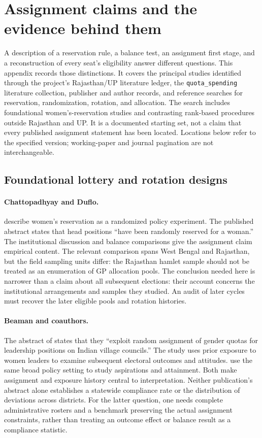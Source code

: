 \section{Assignment claims and the evidence behind them}
\label{app:evidence}

A description of a reservation rule, a balance test, an assignment first stage,
and a reconstruction of every seat's eligibility answer different questions.
This appendix records those distinctions. It covers the principal studies
identified through the project's Rajasthan/UP literature ledger, the
\texttt{quota\_spending} literature collection, publisher and author records,
and reference searches for reservation, randomization, rotation, and allocation.
The search includes foundational women's-reservation studies and contrasting
rank-based procedures outside Rajasthan and UP. It is a documented starting
set, not a claim that every published assignment statement has been located.
Locations below refer to the specified version; working-paper and journal
pagination are not interchangeable.

\subsection{Foundational lottery and rotation designs}

\paragraph{Chattopadhyay and Duflo.}
\citet{chattopadhyay2004} describe women's reservation as a randomized policy
experiment. The published abstract states that head positions ``have been
randomly reserved for a woman.'' The institutional discussion and balance
comparisons give the assignment claim empirical content. The relevant
comparison spans West Bengal and Rajasthan, but the field sampling units differ:
the Rajasthan hamlet sample should not be treated as an enumeration of GP
allocation pools. The conclusion needed here is narrower than a claim about
all subsequent elections: their account concerns the institutional arrangements
and samples they studied. An audit of later cycles must recover the later
eligible pools and rotation histories.

\paragraph{Beaman and coauthors.}
The abstract of \citet{beaman2009} states that they ``exploit random assignment
of gender quotas for leadership positions on Indian village councils.'' The
study uses prior exposure to women leaders to examine subsequent electoral
outcomes and attitudes. \citet{beaman2012} use the same broad policy setting to
study aspirations and attainment. Both make assignment and exposure history
central to interpretation. Neither publication's abstract alone establishes a
statewide compliance rate or the distribution of deviations across districts.
For the latter question, one needs complete administrative rosters and a
benchmark preserving the actual assignment constraints, rather than treating
an outcome effect or balance result as a compliance statistic.

